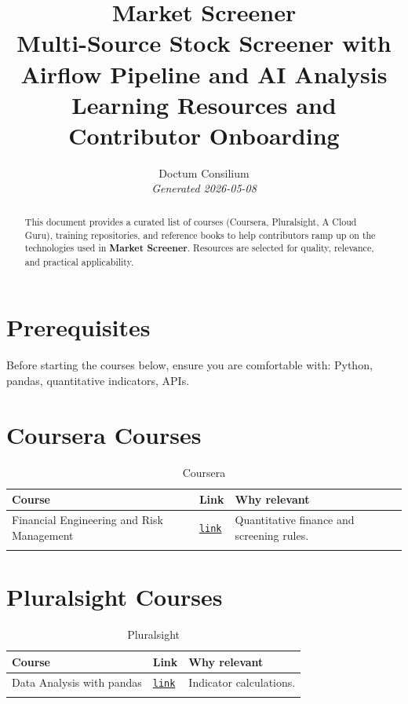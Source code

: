 \documentclass[11pt,a4paper]{article}
\begin{document}
\title{
  \textcolor{doctum}{\Large\textbf{Market Screener}} \\[0.5em]
  \large Multi-Source Stock Screener with Airflow Pipeline and AI Analysis \\[0.3em]
  \normalsize Learning Resources and Contributor Onboarding
}
\author{Doctum Consilium \\ \small\textit{Generated 2026-05-08}}
\date{}
\maketitle
\thispagestyle{fancy}

\begin{abstract}
This document provides a curated list of courses (Coursera, Pluralsight, A Cloud Guru),
training repositories, and reference books to help contributors ramp up on the
technologies used in \textbf{Market Screener}.
Resources are selected for quality, relevance, and practical applicability.
\end{abstract}

\tableofcontents
\newpage

\section{Prerequisites}
Before starting the courses below, ensure you are comfortable with:
Python, pandas, quantitative indicators, APIs.

\section{Coursera Courses}
\begin{longtable}{p{6cm} p{1.5cm} p{7cm}}
\toprule
\textbf{Course} & \textbf{Link} & \textbf{Why relevant} \\
\midrule
\endhead
  Financial Engineering and Risk Management & \href{https://www.coursera.org/specializations/financialengineering}{\texttt{link}} & Quantitative finance and screening rules. \\
\bottomrule
\caption{Coursera}
\end{longtable}


\section{Pluralsight Courses}
\begin{longtable}{p{6cm} p{1.5cm} p{7cm}}
\toprule
\textbf{Course} & \textbf{Link} & \textbf{Why relevant} \\
\midrule
\endhead
  Data Analysis with pandas & \href{https://www.pluralsight.com/courses/data-analysis-pandas}{\texttt{link}} & Indicator calculations. \\
\bottomrule
\caption{Pluralsight}
\end{longtable}
\end{document}
